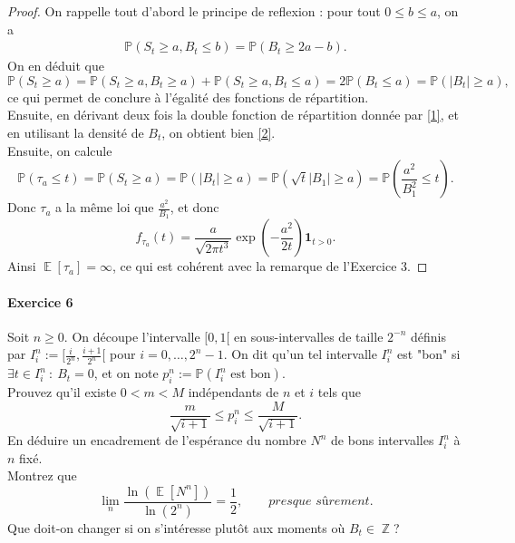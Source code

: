 \documentclass{article}
\theoremstyle{definition}
\numberwithin{equation}{section}
\DeclareMathOperator{\Z}{\mathbb{Z}}
\DeclareMathOperator{\E}{\mathbb{E}}
\begin{document}
\begin{proof}
On rappelle tout d'abord le principe de reflexion : pour tout $0\leq b\leq a$, on a 
\begin{align}
\label{1}
    \mathbb{P}(S_t\geq a, B_t\leq b) = \mathbb{P}(B_t\geq 2a-b).
\end{align}
On en déduit que
$$\mathbb{P}(S_t\geq a)=\mathbb{P}(S_t\geq a, B_t\geq a)+\mathbb{P}(S_t\geq a, B_t\leq a) = 2\mathbb{P}(B_t\leq a)=\mathbb{P}(|B_t|\geq a),$$
ce qui permet de conclure à l'égalité des fonctions de répartition.\\
Ensuite, en dérivant deux fois la double fonction de répartition donnée par \eqref{1}, et en utilisant la densité de $B_t$, on obtient bien \eqref{2}.\\
Ensuite, on calcule 
$$ \mathbb{P}(\tau_a\leq t)=\mathbb{P}(S_t\geq a) = \mathbb{P}(|B_t|\geq a) = \mathbb{P}(\sqrt{t}|B_1|\geq a)=\mathbb{P}\left(\dfrac{a^2}{B_1^2}\leq t\right).$$
Donc $\tau_a$ a la même loi que $\frac{a^2}{B_1}$, et donc
$$ f_{\tau_a}(t)=\dfrac{a}{\sqrt{2\pi t^3}}\exp\left(-\dfrac{a^2}{2t}\right)\mathbf{1}_{t>0}. $$
Ainsi $\E[\tau_a]=\infty$, ce qui est cohérent avec la remarque de l'Exercice 3. 
\end{proof}



\paragraph{Exercice 6}
Soit $n\geq 0$. On découpe l'intervalle $[0,1[$ en sous-intervalles de taille $2^{-n}$ définis par $I^n_i :=[\frac{i}{2^n},\frac{i+1}{2^n}[$ pour $i=0,\dots,2^n-1$. On dit qu'un tel intervalle $I^n_i$ est "bon" si $\exists t\in I^n_i~:~B_t=0$, et on note $p_i^n := \mathbb{P}(I^n_i\text{ est bon})$.\\
Prouvez qu'il existe $0<m<M$ indépendants de $n$ et $i$ tels que  
$$ \dfrac{m}{\sqrt{i+1}} \leq p^n_i \leq \dfrac{M}{\sqrt{i+1}}.$$
En déduire un encadrement de l'espérance du nombre $N^n$ de bons intervalles $I^n_i$ à $n$ fixé.\\
Montrez que
$$\lim_n\dfrac{\ln(\E[N^n])}{\ln(2^n)} = \dfrac{1}{2}, \qquad \textit{presque sûrement}.$$
Que doit-on changer si on s'intéresse plutôt aux moments où $B_t\in \Z$?
\end{document}
